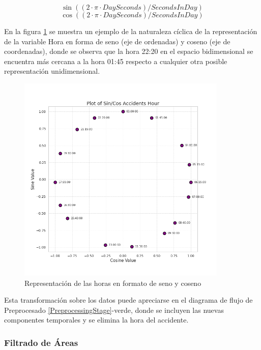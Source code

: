 \begin{equation}
	\sin((2 \cdot \pi \cdot DaySeconds)/SecondsInDay)
	\label{SIN_EQUATION}
\end{equation}
\begin{equation}
	\cos((2 \cdot \pi \cdot DaySeconds)/SecondsInDay)
	\label{COS_EQUATION}
\end{equation}


En la figura \ref{HoursPlot} se muestra un ejemplo de la naturaleza cíclica de la representación de la variable Hora en forma de seno (eje de ordenadas) y coseno (eje de coordenadas), donde se observa que la hora 22:20 en el espacio bidimensional se encuentra más cercana a la hora 01:45 respecto a cualquier otra posible representación unidimensional.

\begin{figure}[h]
	\centering
	\includegraphics[width=10cm]{Figures/normal_plot.png}
	\caption{Representación de las horas en formato de seno y coseno}
	\label{HoursPlot}
\end{figure}

Esta transformación sobre los datos puede apreciarse en el diagrama de flujo de Preprocesado \ref{PreprocessingStage}-verde, donde se incluyen las nuevas componentes temporales y se elimina la hora del accidente.

\subsubsection{Filtrado de Áreas}

